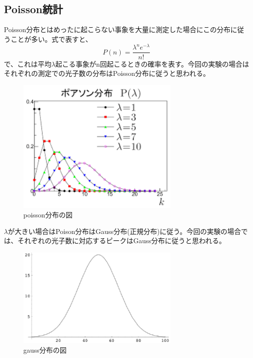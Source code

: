 \documentclass[10pt]{ujarticle}
\begin{document}
\subsection{Poisson統計}
Poisson分布とはめったに起こらない事象を大量に測定した場合にこの分布に従うことが多い。式で表すと、
\begin{equation}
P\left(n\right)=\frac{\lambda^n e^{-\lambda}}{n!}
\end{equation}
で、これは平均$\lambda$起こる事象がn回起こるときの確率を表す。今回の実験の場合はそれぞれの測定での光子数の分布はPoisson分布に従うと思われる。
\begin{figure}[h]
\begin{center}
\includegraphics[width=8cm]{SummerChallenge_poisson.png}
\caption{poisson分布の図}
\label{fig:poisson}
\end{center}
\end{figure}

$\lambda$が大きい場合はPoison分布はGauss分布(正規分布)に従う。今回の実験の場合では、それぞれの光子数に対応するピークはGauss分布に従うと思われる。
\begin{figure}[h]
\begin{center}
\includegraphics[width=8cm]{SummerChallenge_gauss.png}
\caption{gauss分布の図}
\label{fig:gauss}
\end{center}
\end{figure}
\end{document}
